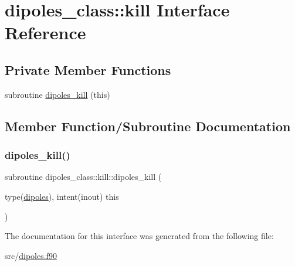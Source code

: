 \hypertarget{interfacedipoles__class_1_1kill}{}\section{dipoles\+\_\+class\+:\+:kill Interface Reference}
\label{interfacedipoles__class_1_1kill}
\subsection*{Private Member Functions}
\begin{DoxyCompactItemize}
\item 
subroutine \hyperlink{interfacedipoles__class_1_1kill_a0dacd933f05d84b7752ed570857ffedc}{dipoles\+\_\+kill} (this)
\end{DoxyCompactItemize}


\subsection{Member Function/\+Subroutine Documentation}
\mbox{\label{interfacedipoles__class_1_1kill_a0dacd933f05d84b7752ed570857ffedc}} 
\subsubsection{\texorpdfstring{dipoles\+\_\+kill()}{dipoles\_kill()}}
{\footnotesize\ttfamily subroutine dipoles\+\_\+class\+::kill\+::dipoles\+\_\+kill (\begin{DoxyParamCaption}\item[{type(\hyperlink{structdipoles__class_1_1dipoles}{dipoles}), intent(inout)}]{this }\end{DoxyParamCaption})\hspace{0.3cm}{\ttfamily [private]}}



The documentation for this interface was generated from the following file\+:\begin{DoxyCompactItemize}
\item 
src/\hyperlink{dipoles_8f90}{dipoles.\+f90}\end{DoxyCompactItemize}

